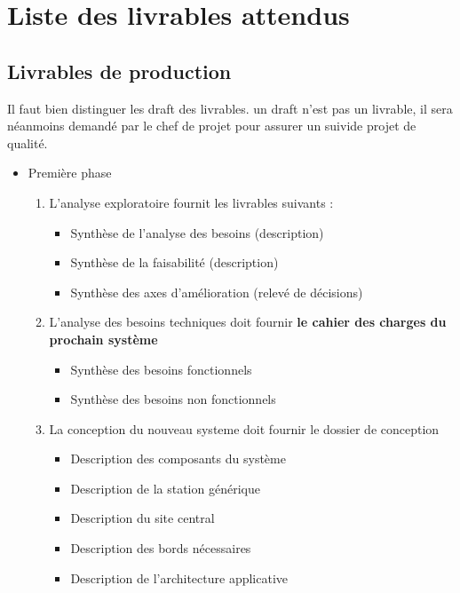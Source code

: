 \section{Liste des livrables attendus}
\subsection{Livrables de production}
Il faut bien distinguer les draft des livrables. un draft n'est pas un livrable, il sera néanmoins demandé par le chef de projet 
pour assurer un suivide projet de qualité.
\begin{itemize}
\item Première phase
\begin{enumerate}
\item L'analyse exploratoire fournit les livrables suivants :
\begin{itemize}
\item Synthèse de l'analyse des besoins (description)
\item Synthèse de la faisabilité (description)
\item Synthèse des axes d'amélioration (relevé de décisions)
\end{itemize}
\item L'analyse des besoins techniques doit fournir \textbf{le cahier des charges du prochain système} 
\begin{itemize}       
\item Synthèse des besoins fonctionnels
\item Synthèse des besoins non fonctionnels       
\end{itemize}       
       
\item La conception du nouveau systeme doit fournir le dossier de conception 
\begin{itemize}
	   
\item Description des composants du système
\item Description de la station générique
\item Description du site central
\item Description des bords nécessaires
\item Description de l'architecture applicative   
\begin{itemize}


\end{itemize}
\end{itemize}
\end{enumerate}
\end{itemize}
